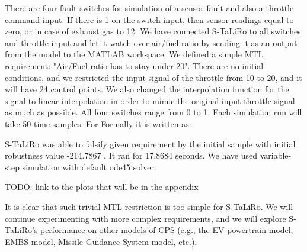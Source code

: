 There are four fault switches for simulation of a sensor fault and also a throttle command input. If there is 1 on the switch input, then sensor readings equal to zero, or in case of exhaust gas to 12. We have connected S-TaLiRo to all switches and throttle input and let it watch over air/fuel ratio by sending it as an output from the model to the MATLAB workspace. We defined a simple MTL requirement: "Air/Fuel ratio has to stay under 20". There are no initial conditions, and we restricted the input signal of the throttle from 10 to 20, and it will have 24 control points. We also changed the interpolation function for the signal to linear interpolation in order to mimic the original input throttle signal as much as possible. All four switches range from 0 to 1. Each simulation run will take 50-time samples. For Formally it is written as:



S-TaLiRo was able to falsify given requirement by the initial sample with initial robustness value -214.7867 \cite{Fainekos:RobustnessFinite}. It ran for 17.8684 seconds. We have used variable-step simulation with default ode45 solver.

TODO: link to the plots that will be in the appendix

It is clear that such trivial MTL restriction is too simple for S-TaLiRo. We will continue experimenting with more complex requirements, and we will explore S-TaLiRo's performance on other models of CPS (e.g., the EV powertrain model, EMBS model, Missile Guidance System model, etc.).
 
